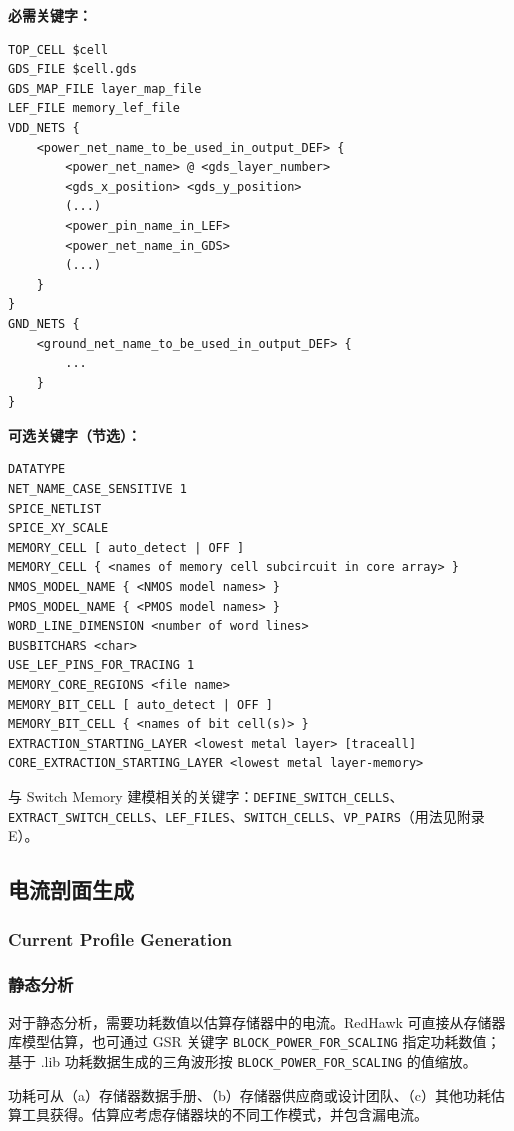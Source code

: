 \textbf{必需关键字：}
\begin{lstlisting}
TOP_CELL $cell
GDS_FILE $cell.gds
GDS_MAP_FILE layer_map_file
LEF_FILE memory_lef_file
VDD_NETS {
    <power_net_name_to_be_used_in_output_DEF> {
        <power_net_name> @ <gds_layer_number>
        <gds_x_position> <gds_y_position>
        (...)
        <power_pin_name_in_LEF>
        <power_net_name_in_GDS>
        (...)
    }
}
GND_NETS {
    <ground_net_name_to_be_used_in_output_DEF> {
        ...
    }
}
\end{lstlisting}

\textbf{可选关键字（节选）：}
\begin{lstlisting}
DATATYPE
NET_NAME_CASE_SENSITIVE 1
SPICE_NETLIST
SPICE_XY_SCALE
MEMORY_CELL [ auto_detect | OFF ]
MEMORY_CELL { <names of memory cell subcircuit in core array> }
NMOS_MODEL_NAME { <NMOS model names> }
PMOS_MODEL_NAME { <PMOS model names> }
WORD_LINE_DIMENSION <number of word lines>
BUSBITCHARS <char>
USE_LEF_PINS_FOR_TRACING 1
MEMORY_CORE_REGIONS <file name>
MEMORY_BIT_CELL [ auto_detect | OFF ]
MEMORY_BIT_CELL { <names of bit cell(s)> }
EXTRACTION_STARTING_LAYER <lowest metal layer> [traceall]
CORE_EXTRACTION_STARTING_LAYER <lowest metal layer-memory>
\end{lstlisting}

与 Switch Memory 建模相关的关键字：\texttt{DEFINE\_SWITCH\_CELLS}、\texttt{EXTRACT\_SWITCH\_CELLS}、\texttt{LEF\_FILES}、\texttt{SWITCH\_CELLS}、\texttt{VP\_PAIRS}（用法见附录 E）。

\subsection{电流剖面生成}
\subsubsection*{Current Profile Generation}

\subsubsection{静态分析}
对于静态分析，需要功耗数值以估算存储器中的电流。RedHawk 可直接从存储器库模型估算，也可通过 GSR 关键字 \texttt{BLOCK\_POWER\_FOR\_SCALING} 指定功耗数值；基于 .lib 功耗数据生成的三角波形按 \texttt{BLOCK\_POWER\_FOR\_SCALING} 的值缩放。

功耗可从（a）存储器数据手册、（b）存储器供应商或设计团队、（c）其他功耗估算工具获得。估算应考虑存储器块的不同工作模式，并包含漏电流。

